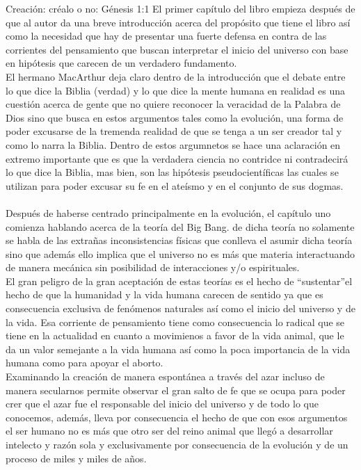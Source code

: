 %
\begin{section}{Creación: créalo o no: Génesis 1:1}
	El primer capítulo del libro empieza después de que al autor da una breve introducción acerca del propósito que tiene el libro así como la necesidad que hay de presentar una fuerte defensa en contra de las corrientes del pensamiento que buscan interpretar el inicio del universo con base en hipótesis que carecen de un verdadero fundamento.\\
	El hermano MacArthur deja claro dentro de la introducción que el debate entre lo que dice la Biblia (verdad) y lo que dice la mente humana en realidad es una cuestión acerca de gente que no quiere reconocer la veracidad de la Palabra de Dios sino que busca en estos argumentos tales como la evolución, una forma de poder excusarse de la tremenda realidad de que se tenga a un ser creador tal y como lo narra la Biblia. Dentro de estos argumnetos se hace una aclaración en extremo importante que es que la verdadera ciencia no contridce ni contradecirá lo que dice la Biblia, mas bien, son las hipótesis pseudocientíficas las cuales se utilizan para poder excusar su fe en el ateísmo y en el conjunto de sus dogmas.\\
	\\
Después de haberse centrado principalmente en la evolución, el capítulo uno comienza hablando acerca de la teoría del Big Bang. de dicha teoría no solamente se habla de las extrañas inconsistencias físicas que conlleva el asumir dicha teoría sino que además ello implica que el universo no es más que materia interactuando de manera mecánica sin posibilidad de interacciones y/o espirituales.\\
El gran peligro de la gran aceptación de estas teorías es el hecho de ``sustentar''el hecho de que la humanidad y la vida humana carecen de sentido ya que es consecuencia exclusiva de fenómenos naturales así como el inicio del universo y de la vida. Esa corriente de pensamiento tiene como consecuencia lo radical que se tiene en la actualidad en cuanto a movimienos a favor de la vida animal, que le da un valor semejante a la vida humana así como la poca importancia de la vida humana como para apoyar el aborto.\\
Examinando la creación de manera espontánea a través del azar incluso de manera secularnos permite observar el gran salto de fe que se ocupa para poder crer que el azar fue el responsable del inicio del universo y de todo lo que conocemos, además, lleva por consecuencia el hecho de que con esos argumentos el ser humano no es más que otro ser del reino animal que llegó a desarrollar intelecto y razón sola y exclusivamente por consecuencia de la evolución y de un proceso de miles y miles de años.\\

\end{section}
